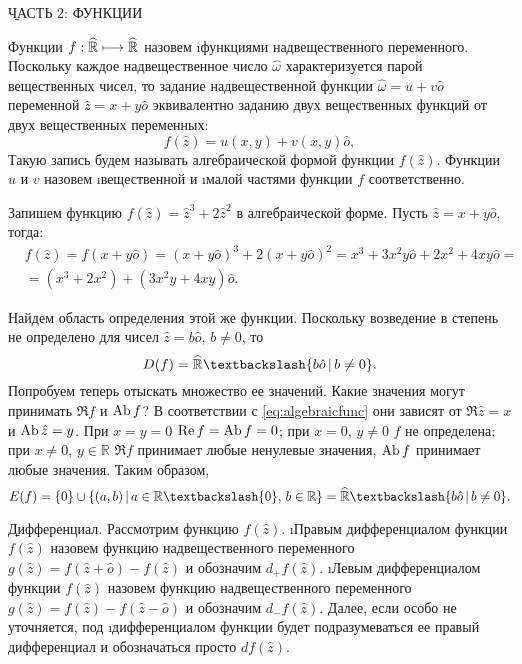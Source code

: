 \begin{center}
	\b{ЧАСТЬ 2: ФУНКЦИИ}
\end{center}

Функции $f: \widehat{\mathbb{R}} \longmapsto \widehat{\mathbb{R}}$ назовем \i{функциями надвещественного переменного}. Поскольку каждое надвещественное число $\hat{\omega}$ характеризуется парой вещественных чисел, то задание надвещественной функции $\hat{\omega}=u+v\hat{o}$ переменной $\hat{z}=x+y\hat{o}$ эквивалентно заданию двух вещественных функций от двух вещественных переменных:
\begin{equation}\label{eq:algebraicfunc}
	f(\hat{z})=u(x, y)+v(x, y)\hat{o},
\end{equation}
Такую запись будем называть алгебраической формой функции $f(\hat{z})$. Функции $u$ и $v$ назовем \i{вещественной} и \i{малой} частями функции $f$ соответственно.
\begin{example}
	Запишем функцию $f(\hat{z})=\hat{z}^3+2\hat{z}^2$ в алгебраической форме. Пусть $\hat{z}=x+y\hat{o}$, тогда:
	\begin{eqnarray*}
		&f(\hat{z})=f(x+y\hat{o})=(x+y\hat{o})^3+2(x+y\hat{o})^2=x^3+3x^2y\hat{o}+2x^2+4xy\hat{o}=      \\ &=(x^3+2x^2)+(3x^2y+4xy)\hat{o}.
	\end{eqnarray*}
\end{example}
\begin{example}
	Найдем область определения этой же функции. Поскольку возведение в степень не определено для чисел $\hat{z}=b\hat{o}$, $b\neq 0$, то 
		$$D(f)=\AbR\textbackslash\{b\hat{o}\,|\,b\neq 0\}.$$
	Попробуем теперь отыскать множество ее значений. Какие значения могут принимать $\Re{f}$ и $\operatorname{Ab}{f}$? В соответствии с \eqref{eq:algebraicfunc} они зависят от $\Re{\hat{z}}=x$ и $\operatorname{Ab}{\hat{z}}=y$. При $x=y=0$ $\operatorname{Re} f=\operatorname{Ab}{f}=0$; при $x=0$, $y\neq 0$ $f$ не определена; при $x\neq 0$, $y\in\mathbb{R}$ $\Re{f}$ принимает любые ненулевые значения, $\operatorname{Ab}{f}$ принимает любые значения. Таким образом, 
		$$E(f)=\{0\}\cup\{(a, b)\,|\,a\in\mathbb{R}\textbackslash\{0\},\,b\in\mathbb{R}\}\hm=\AbR\textbackslash\{b\hat{o}\,|\,b\neq 0\}.$$
\end{example}
\b{Дифференциал.} Рассмотрим функцию $f(\hat{z})$. \i{Правым дифференциалом функции $f(\hat{z})$} назовем функцию надвещественного переменного $g(\hat{z})=f(\hat{z}+\hat{o})-f(\hat{z})$ и обозначим $d_{+}f(\hat{z})$. \i{Левым дифференциалом функции $f(\hat{z})$} назовем функцию надвещественного переменного $g(\hat{z})=f(\hat{z})-f(\hat{z}-\hat{o})$ и обозначим $d_{-}f(\hat{z})$. Далее, если особо не уточняется, под \i{дифференциалом функции} будет подразумеваться ее правый дифференциал и обозначаться просто $df(\hat{z})$.
